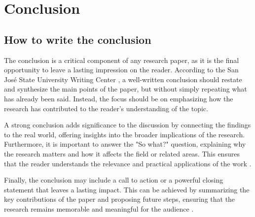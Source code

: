 \setcounter{chapter}{5}
\chapter{Conclusion} \label{chap::conclusion}
\section{How to write the conclusion}
The conclusion is a critical component of any research paper, as it is the final opportunity to leave a lasting impression on the reader. According to the San José State University Writing Center \cite{SJSUWritingCenterConclusion}, a well-written conclusion should restate and synthesize the main points of the paper, but without simply repeating what has already been said. Instead, the focus should be on emphasizing how the research has contributed to the reader’s understanding of the topic.

A strong conclusion adds significance to the discussion by connecting the findings to the real world, offering insights into the broader implications of the research. Furthermore, it is important to answer the "So what?" question, explaining why the research matters and how it affects the field or related areas. This ensures that the reader understands the relevance and practical applications of the work \cite{SJSUWritingCenterConclusion}.

Finally, the conclusion may include a call to action or a powerful closing statement that leaves a lasting impact. This can be achieved by summarizing the key contributions of the paper and proposing future steps, ensuring that the research remains memorable and meaningful for the audience \cite{SJSUWritingCenterConclusion}.
